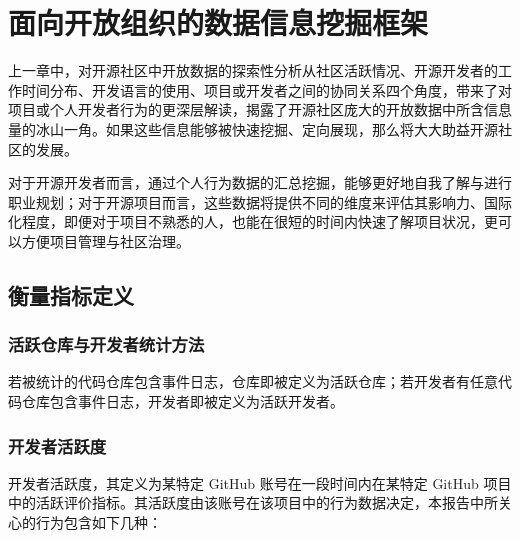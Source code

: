 \section{面向开放组织的数据信息挖掘框架}
\par 上一章中，对开源社区中开放数据的探索性分析从社区活跃情况、开源开发者的工作时间分布、开发语言的使用、项目或开发者之间的协同关系四个角度，带来了对项目或个人开发者行为的更深层解读，揭露了开源社区庞大的开放数据中所含信息量的冰山一角。如果这些信息能够被快速挖掘、定向展现，那么将大大助益开源社区的发展。

\par 对于开源开发者而言，通过个人行为数据的汇总挖掘，能够更好地自我了解与进行职业规划；对于开源项目而言，这些数据将提供不同的维度来评估其影响力、国际化程度，即便对于项目不熟悉的人，也能在很短的时间内快速了解项目状况，更可以方便项目管理与社区治理。


\subsection{衡量指标定义}
\subsubsection{活跃仓库与开发者统计方法}
\par 若被统计的代码仓库包含事件日志，仓库即被定义为活跃仓库；若开发者有任意代码仓库包含事件日志，开发者即被定义为活跃开发者。

\subsubsection{开发者活跃度}
\par 开发者活跃度，其定义为某特定 GitHub 账号在一段时间内在某特定 GitHub 项目中的活跃评价指标。其活跃度由该账号在该项目中的行为数据决定，本报告中所关心的行为包含如下几种：

